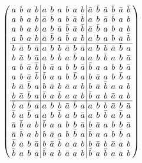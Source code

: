 \documentclass{beamer}
\begin{document}
\begin{frame}

  \[
    \arraycolsep=2.0pt\def\arraystretch{0.75}
    \left(
      \begin{array}{cccc|cccccc|cccccc}
        a&b&a&b&a&b&a&b&a&b&\bar{a}&\bar{b}&\bar{a}&\bar{b}&\bar{a}&\bar{b}\\
        a&b&a&b&\bar{a}&\bar{b}&a&b&\bar{a}&\bar{b}&a&b&\bar{a}&\bar{b}&a&b\\
        a&b&a&b&a&b&\bar{a}&\bar{b}&\bar{a}&\bar{b}&\bar{a}&\bar{b}&a&b&a&b\\
        a&b&a&b&\bar{a}&\bar{b}&\bar{a}&\bar{b}&a&b&a&b&a&b&\bar{a}&\bar{b}\\\hline
        b&\bar{a}&b&\bar{a}&a&b&b&\bar{a}&b&\bar{a}&a&b&b&\bar{a}&\bar{b}&a\\
        b&\bar{a}&b&\bar{a}&a&b&\bar{b}&a&\bar{b}&a&a&b&\bar{b}&a&b&\bar{a}\\
        a&b&\bar{a}&\bar{b}&b&\bar{a}&a&b&b&\bar{a}&\bar{b}&a&a&b&b&\bar{a}\\
        a&b&\bar{a}&\bar{b}&\bar{b}&a&a&b&\bar{b}&a&b&\bar{a}&a&b&\bar{b}&a\\
        b&\bar{a}&\bar{b}&a&b&\bar{a}&b&\bar{a}&a&b&b&\bar{a}&\bar{b}&a&a&b\\
        b&\bar{a}&\bar{b}&a&\bar{b}&a&\bar{b}&a&a&b&\bar{b}&a&b&\bar{a}&a&b\\\hline
        \bar{b}&a&\bar{b}&a&a&b&b&\bar{a}&\bar{b}&a&a&b&b&\bar{a}&b&\bar{a}\\
        \bar{b}&a&\bar{b}&a&a&b&\bar{b}&a&b&\bar{a}&a&b&\bar{b}&a&\bar{b}&a\\
        \bar{a}&\bar{b}&a&b&\bar{b}&a&a&b&b&\bar{a}&b&\bar{a}&a&b&b&\bar{a}\\
        \bar{a}&\bar{b}&a&b&b&\bar{a}&a&b&\bar{b}&a&\bar{b}&a&a&b&\bar{b}&a\\
        \bar{b}&a&b&\bar{a}&b&\bar{a}&\bar{b}&a&a&b&b&\bar{a}&b&\bar{a}&a&b\\
        \bar{b}&a&b&\bar{a}&\bar{b}&a&b&\bar{a}&a&b&\bar{b}&a&\bar{b}&a&a&b\\
      \end{array}
    \right)
  \]
  
\end{frame}
\end{document}

